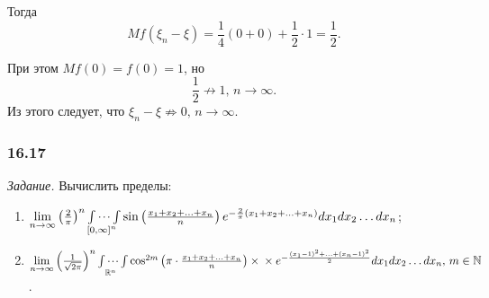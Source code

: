 Тогда
$$Mf \left( \xi_n - \xi \right) =
\frac{1}{4} \left( 0 + 0 \right) + \frac{1}{2} \cdot 1 =
\frac{1}{2}.$$

При этом $Mf \left( 0 \right) = f \left( 0 \right) = 1$, но
$$ \frac{1}{2} \not \to 1, \,
n \rightarrow \infty.$$
Из этого следует, что $ \xi_n - \xi \not \Rightarrow 0, \, n \rightarrow \infty $.

\subsubsection*{16.17}

\textit{Задание.} Вычислить пределы:
\begin{enumerate}[label=\alph*)]
\item $ \lim \limits_{n \to \infty } \left( \frac{2}{ \pi } \right)^n
\idotsint \limits_{ \left[ 0, \infty \right]^n}
\sin \left( \frac{x_1 + x_2 + \dotsc + x_n}{n} \right)
e^{- \frac{2}{ \pi } \left( x_1 + x_2 + \dotsc + x_n \right) }
dx_1 dx_2 \dotsc dx_n$;
\item $ \lim \limits_{n \to \infty } \left( \frac{1}{ \sqrt{2 \pi }} \right)^n
\idotsint \limits_{ \mathbb{R}^n} \cos^{2m}
\left( \pi \cdot \frac{x_1 + x_2 + \dotsc + x_n}{n} \right) \times \\
\times e^{- \frac{ \left( x_1 - 1 \right)^2 + \dotsc + \left( x_n - 1 \right)^2}{2}}
dx_1 dx_2 \dotsc dx_n, \,
m \in \mathbb{N}$.
\end{enumerate}

